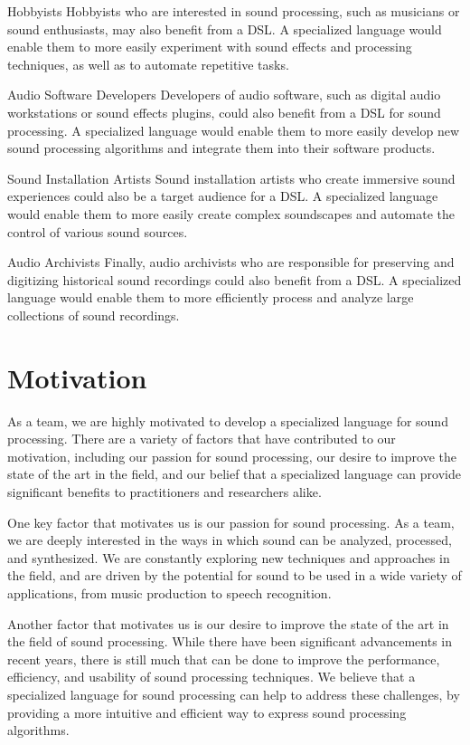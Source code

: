 Hobbyists
Hobbyists who are interested in sound processing, such as musicians or sound enthusiasts, may also benefit from a DSL. A specialized language would enable them to more easily experiment with sound effects and processing techniques, as well as to automate repetitive tasks.

Audio Software Developers
Developers of audio software, such as digital audio workstations or sound effects plugins, could also benefit from a DSL for sound processing. A specialized language would enable them to more easily develop new sound processing algorithms and integrate them into their software products.

Sound Installation Artists
Sound installation artists who create immersive sound experiences could also be a target audience for a DSL. A specialized language would enable them to more easily create complex soundscapes and automate the control of various sound sources.

Audio Archivists
Finally, audio archivists who are responsible for preserving and digitizing historical sound recordings could also benefit from a DSL. A specialized language would enable them to more efficiently process and analyze large collections of sound recordings.

\section{Motivation} 
As a team, we are highly motivated to develop a specialized language for sound processing. There are a variety of factors that have contributed to our motivation, including our passion for sound processing, our desire to improve the state of the art in the field, and our belief that a specialized language can provide significant benefits to practitioners and researchers alike.

One key factor that motivates us is our passion for sound processing. As a team, we are deeply interested in the ways in which sound can be analyzed, processed, and synthesized. We are constantly exploring new techniques and approaches in the field, and are driven by the potential for sound to be used in a wide variety of applications, from music production to speech recognition.

Another factor that motivates us is our desire to improve the state of the art in the field of sound processing. While there have been significant advancements in recent years, there is still much that can be done to improve the performance, efficiency, and usability of sound processing techniques. We believe that a specialized language for sound processing can help to address these challenges, by providing a more intuitive and efficient way to express sound processing algorithms.

